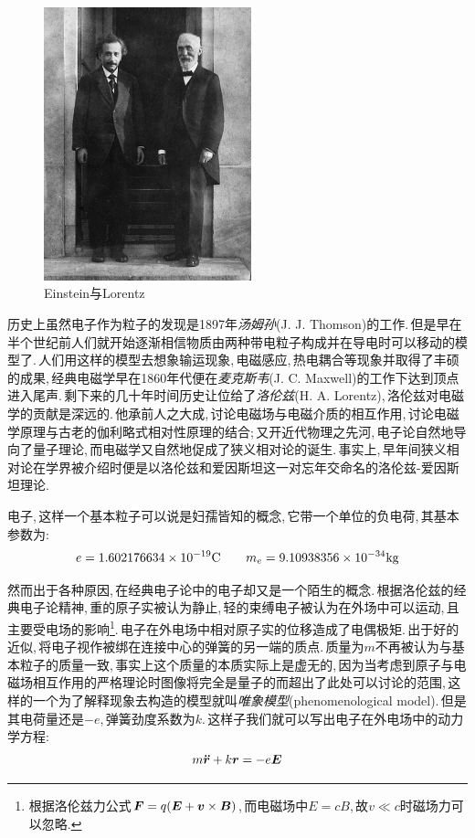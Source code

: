 \begin{figure}
\centering
\vspace{-3pt}
\includegraphics[width=6cm]{image/18-1-2.jpg}
\caption{\rm Einstein与Lorentz}
\end{figure}

历史上虽然电子作为粒子的发现是1897年\emph{汤姆孙}({\rm J. J. Thomson})的工作.\,但是早在半个世纪前人们就开始逐渐相信物质由两种带电粒子构成并在导电时可以移动的模型了.\,人们用这样的模型去想象输运现象,\,电磁感应,\,热电耦合等现象并取得了丰硕的成果,\,经典电磁学早在1860年代便在\emph{麦克斯韦}({\rm J. C. Maxwell})的工作下达到顶点进入尾声.\,剩下来的几十年时间历史让位给了\emph{洛伦兹}({\rm H. A. Lorentz}),\,洛伦兹对电磁学的贡献是深远的.\,他承前人之大成,\,讨论电磁场与电磁介质的相互作用,\,讨论电磁学原理与古老的伽利略式相对性原理的结合;\,又开近代物理之先河,\,电子论自然地导向了量子理论,\,而电磁学又自然地促成了狭义相对论的诞生.\,事实上,\,早年间狭义相对论在学界被介绍时便是以洛伦兹和爱因斯坦这一对忘年交命名的洛伦兹-爱因斯坦理论.

电子,\,这样一个基本粒子可以说是妇孺皆知的概念,\,它带一个单位的负电荷,\,其基本参数为:
\[e=1.602176634\times 10^{-19}{\rm C}\qquad m_e=9.10938356\times 10^{-34}{\rm kg}\]

然而出于各种原因,\,在经典电子论中的电子却又是一个陌生的概念.\,根据洛伦兹的经典电子论精神,\,重的原子实被认为静止,\,轻的束缚电子被认为在外场中可以运动,\,且主要受电场的影响\footnote{根据洛伦兹力公式$\boldsymbol{F}=q(\boldsymbol{E}+\boldsymbol{v}\times\boldsymbol{B})$,\,而电磁场中$E=cB$,\,故$v\ll c$时磁场力可以忽略.}.\,电子在外电场中相对原子实的位移造成了电偶极矩.\,出于好的近似,\,将电子视作被绑在连接中心的弹簧的另一端的质点.\,质量为$m$不再被认为与基本粒子的质量一致,\,事实上这个质量的本质实际上是虚无的,\,因为当考虑到原子与电磁场相互作用的严格理论时图像将完全是量子的而超出了此处可以讨论的范围,\,这样的一个为了解释现象去构造的模型就叫\emph{唯象模型}(phenomenological model).\,但是其电荷量还是$-e$,\,弹簧劲度系数为$k$.\,这样子我们就可以写出电子在外电场中的动力学方程:
\[m\boldsymbol{\ddot{r}}+k\boldsymbol{r}=-e\boldsymbol{E}\]

